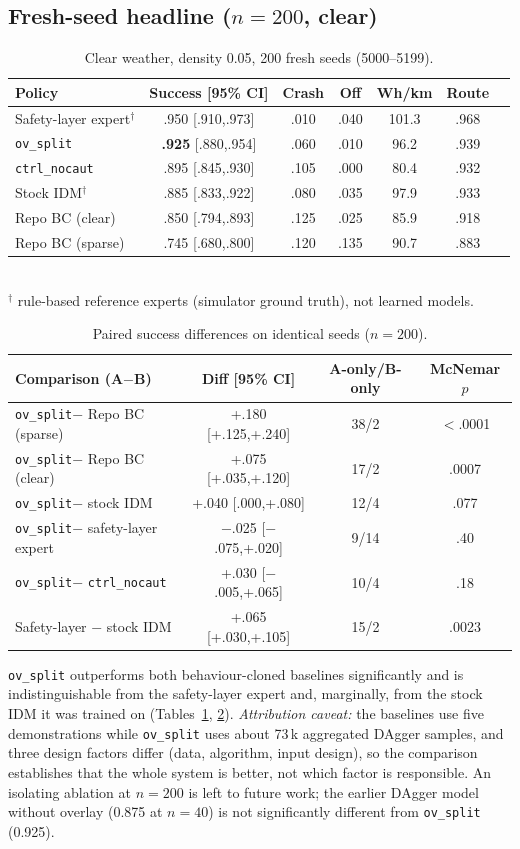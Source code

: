 \documentclass[conference]{IEEEtran}
\newcommand{\ovs}{\texttt{ov\_split}}
\newcommand{\ctrl}{\texttt{ctrl\_nocaut}}
\begin{document}
\subsection{Fresh-seed headline ($n{=}200$, clear)}\label{sec:headline}
\begin{table}[t]
\caption{Clear weather, density 0.05, 200 fresh seeds (5000--5199).}
\label{tab:n200}
\centering\small
\setlength{\tabcolsep}{3pt}
\begin{tabular}{lcccccc}
\toprule
Policy & Success [95\% CI] & Crash & Off & Wh/km & Route\\
\midrule
Safety-layer expert$^\dagger$ & .950 [.910,.973] & .010 & .040 & 101.3 & .968\\
\ovs & \textbf{.925} [.880,.954] & .060 & .010 & 96.2 & .939\\
\ctrl & .895 [.845,.930] & .105 & .000 & 80.4 & .932\\
Stock IDM$^\dagger$ & .885 [.833,.922] & .080 & .035 & 97.9 & .933\\
Repo BC (clear) & .850 [.794,.893] & .125 & .025 & 85.9 & .918\\
Repo BC (sparse) & .745 [.680,.800] & .120 & .135 & 90.7 & .883\\
\bottomrule
\end{tabular}\\[2pt]
{\footnotesize $^\dagger$ rule-based reference experts (simulator ground truth), not learned models.}
\end{table}
\begin{table}[t]
\caption{Paired success differences on identical seeds ($n{=}200$).}
\label{tab:paired}
\centering\small
\setlength{\tabcolsep}{3pt}
\begin{tabular}{lccc}
\toprule
Comparison (A$-$B) & Diff [95\% CI] & A-only/B-only & McNemar $p$\\
\midrule
\ovs $-$ Repo BC (sparse) & +.180 [+.125,+.240] & 38/2 & $<$.0001\\
\ovs $-$ Repo BC (clear) & +.075 [+.035,+.120] & 17/2 & .0007\\
\ovs $-$ stock IDM & +.040 [.000,+.080] & 12/4 & .077\\
\ovs $-$ safety-layer expert & $-$.025 [$-$.075,+.020] & 9/14 & .40\\
\ovs $-$ \ctrl & +.030 [$-$.005,+.065] & 10/4 & .18\\
Safety-layer $-$ stock IDM & +.065 [+.030,+.105] & 15/2 & .0023\\
\bottomrule
\end{tabular}
\end{table}
\ovs{} outperforms both behaviour-cloned baselines significantly and is indistinguishable from the safety-layer expert and, marginally, from the stock IDM it was trained on (Tables~\ref{tab:n200}, \ref{tab:paired}). \emph{Attribution caveat:} the baselines use five demonstrations while \ovs{} uses about 73\,k aggregated DAgger samples, and three design factors differ (data, algorithm, input design), so the comparison establishes that the whole system is better, not which factor is responsible. An isolating ablation at $n{=}200$ is left to future work; the earlier DAgger model without overlay (0.875 at $n{=}40$) is not significantly different from \ovs{} (0.925).
\end{document}
